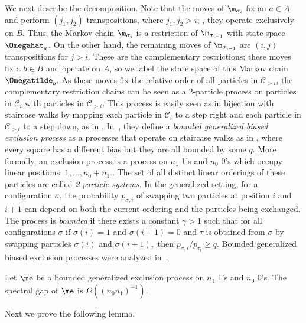 \documentclass{toc}
\begin{document}
We next describe the decomposition.  Note that the moves of 
$\m_{\sigma_i}$ fix an $a \in A$ and 
perform $(j_1,j_2)$ transpositions, where $j_1,j_2>i$; \ie,  they 
operate exclusively on $B$. Thus, the Markov chain $\m_{\sigma_i}$ is a 
restriction of $\m_{\sigma_{i-1}}$ with state space 
$\Omegahat_{a}$.
On the other hand, the remaining moves of $\m_{\sigma_{i-1}}$ 
are $(i,j)$ transpositions for $j>i$.  These are the complementary 
restrictions; these moves fix a $b \in B$ and operate on $A$, so we 
label the state space of this Markov chain $\Omegatilde_b$.  As these 
moves fix the relative order of all particles in $\mathcal{C}_{>i}$, 
the complementary restriction chains can be seen as a 2-particle process on particles in $\mathcal{C}_{i}$  with particles in $\mathcal{C}_{> i}$.  This process is easily seen as in bijection with staircase walks by mapping each particle in $\mathcal{C}_{i}$ to a step right and each particle in $\mathcal{C}_{> i}$ to a step down, as in .  
In~\cite{MS}, they define a \emph{bounded generalized biased exclusion process}  as a processes that operate on 
staircase walks as in , where every square 
has a different bias but they are all bounded by some $q$.  More formally, an exclusion process is a process on $n_1$ 1's and $n_0$ 0's which occupy linear positions: $1, \ldots, n_0 + n_1.$. The set of all distinct linear orderings of these particles are called \emph{2-particle systems}.  In the generalized setting, for a configuration $\sigma$, the probability $p_{\sigma, i}$ of swapping two particles at position $i$ and $i+1$  can depend on both the current ordering and the particles being exchanged.  The process is \emph{bounded} if there exists  a constant $\gamma > 1$ such that for all configurations $\sigma$ if $\sigma(i)  =1$ and $\sigma(i+1) = 0$ and $\tau$ is obtained from $\sigma$ by swapping particles $\sigma(i)$ and $\sigma(i+1),$ then $p_{\sigma,i}/p_{\tau_i}\geq q.$  Bounded generalized biased exclusion 
processes were analyzed in~\cite{MS}. 

\begin{theorem}[\cite{MS}]\label{boundedBias} Let $\me$ be a bounded 
generalized exclusion process on $n_1$ 1's and $n_0$ 0's.  The spectral 
gap of $\me$ is $\Omega((n_0n_1)^{-1})$.
\end{theorem}

Next we prove the following lemma.  
\end{document}
